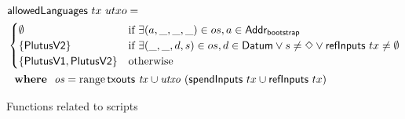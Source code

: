\begin{figure*}
\begin{align*}
    & \mathsf{allowedLanguages}~tx~utxo = \\
    & \begin{cases}
        \emptyset                   & \text{if}~\exists (a, \_, \_, \_) \in os, a \in \mathsf{Addr_{bootstrap}} \\
        \{ \mathsf{PlutusV2} \}            & \text{if}~\exists (\_, \_, d, s) \in os, d \in \mathsf{Datum} \lor s \neq \Diamond \lor \mathsf{refInputs}~tx \neq \emptyset \\
        \{ \mathsf{PlutusV1}, \mathsf{PlutusV2} \} & \text{otherwise}
      \end{cases} \\
    & ~ ~ \mathbf{where}~ ~  \mathit{os} = \operatorname{range} \mathsf{txouts}~ \mathit{tx} \cup \mathit{utxo}~(\mathsf{spendInputs}~tx \cup \mathsf{refInputs}~tx)
  \end{align*}
  \caption{Functions related to scripts}
  \label{fig:functions:data}
\end{figure*}

